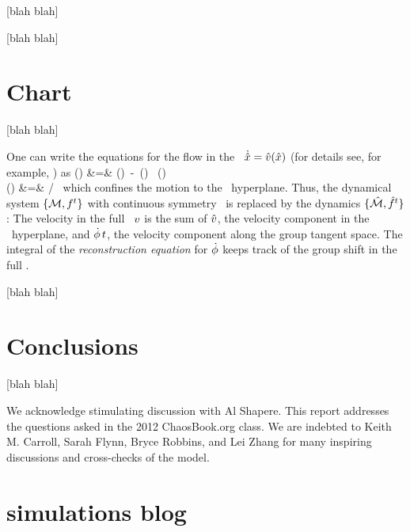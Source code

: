 \documentclass[aip,cha,
reprint,
secnumarabic,
nofootinbib, tightenlines,
nobibnotes, showkeys, showpacs,
groupedaddress,
]{revtex4-1}
\begin{document}
 [blah blah]

 [blah blah]

\section{Chart}
\label{s:slice}

 [blah blah]

One can write the equations for the flow in the \reducedsp\
$\dot{\hat{x}} = \hat{v}(\hat{x})$ (for details see, for example,
\refref{DasBuch}) as
\bea
\velRed(\sspRed) &=& \vel(\sspRed)
     \,-\, \dot{\gSpace}(\sspRed) \, \groupTan(\sspRed)
\label{2modesEqMotMFrame}\\
\dot{\gSpace}(\sspRed) &=& \braket{\vel(\sspRed)}{\sliceTan{}}
                       /\braket{\groupTan(\sspRed)}{\sliceTan{}}
\,
\label{2modesreconstrEq}
\eea
which confines the motion to the \slice\ hyperplane. Thus, the dynamical
system $\{{\cal M},f^t\}$ with continuous symmetry \Group\ is replaced by
the {\reducedsp} dynamics $\{\hat{\cal M},\hat{f}^t\}$: The velocity in the
full \statesp\ $v$ is the sum of $\hat{v}$, the velocity component in
the \slice\ hyperplane, and $\dot{{\bf \phi}}\,t$, the velocity
component along the group tangent space. The integral of the {\em
reconstruction equation} for $\dot{{\bf \phi}}$ keeps track of the group
shift in the full \statesp.


 [blah blah]


\section{Conclusions}
\label{s:concl}

 [blah blah]

\begin{acknowledgments}
We acknowledge stimulating discussion with Al Shapere.
This report addresses the questions asked in
the 2012 ChaosBook.org class.
We are indebted to Keith M. Carroll, Sarah Flynn,
Bryce Robbins,
and
Lei Zhang
for many inspiring discussions and cross-checks of the model.
\end{acknowledgments}





\ifdraft
    \onecolumngrid

    \newpage

    \newpage
    \section{{\twoMode} simulations blog}
    \label{chap:Mathematica}

\end{document}
